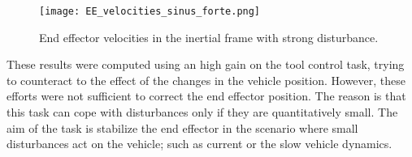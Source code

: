 \documentclass{article}
\begin{document}
\begin{figure}[H]
	\centering
	{\texttt{[image: EE\_velocities\_sinus\_forte.png]}}
	\caption{End effector velocities in the inertial frame with strong disturbance.}
	\label{im:tool_vel3}
\end{figure}
These results were computed using an high gain on the tool control task, trying to counteract to the effect of the changes in the vehicle position. However, these efforts were not sufficient to correct the end effector position. The reason is that this task can cope with disturbances only if they are quantitatively small. The aim of the task is stabilize the end effector in the scenario where small disturbances act on the vehicle; such as current or the slow vehicle dynamics. 

















\end{document}
